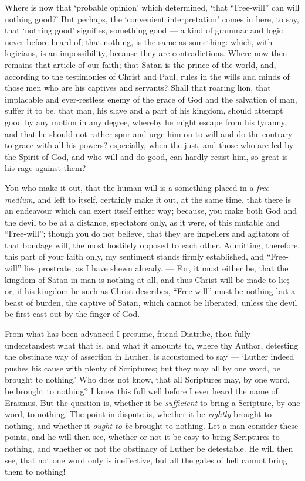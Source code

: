 Where is now that ‘probable opinion’ which determined, ‘that “Free-will” can will nothing good?’ But perhaps, the ‘convenient interpretation’ comes in here, to say, that ‘nothing good’ signifies, something good — a kind of grammar and logic never before heard of; that nothing, is the same as something: which, with logicians, is an impossibility, because they are contradictions. Where now then remains that article of our faith; that Satan is the prince of the world, and, according to the testimonies of Christ and Paul, rules in the wills and minds of those men who are his captives and servants? Shall that roaring lion, that implacable and ever-restless enemy of the grace of God and the salvation of man, suffer it to be, that man, his slave and a part of his kingdom, should attempt good by any motion in any degree, whereby he might escape from his tyranny, and that he should not rather spur and urge him on to will and do the contrary to grace with all his powers? especially, when the just, and those who are led by the Spirit of God, and who will and do good, can hardly resist him, so great is his rage against them?

You who make it out, that the human will is a something placed in a \emph{free medium, }and left to itself, certainly make it out, at the same time, that there is an endeavour which can exert itself either way; because, you make both God and the devil to be at a distance, spectators only, as it were, of this mutable and “Free-will”; though you do not believe, that they are impellers and agitators of that bondage will, the most hostilely opposed to each other. Admitting, therefore, this part of your faith only, my sentiment stands firmly established, and “Free-will” lies prostrate; as I have shewn already. — For, it must either be, that the kingdom of Satan in man is nothing at all, and thus Christ will be made to lie; or, if his kingdom be such as Christ describes, “Free-will” must be nothing but a beast of burden, the captive of Satan, which cannot be liberated, unless the devil be first cast out by the finger of God.

From what has been advanced I presume, friend Diatribe, thou fully understandest what that is, and what it amounts to, where thy Author, detesting the obstinate way of assertion in Luther, is accustomed to say — ‘Luther indeed pushes his cause with plenty of Scriptures; but they may all by one word, be brought to nothing.’ Who does not know, that all Scriptures may, by one word, be brought to nothing? I knew this full well before I ever heard the name of Erasmus. But the question is, whether it be \emph{sufficient }to bring a Scripture, by one word, to nothing. The point in dispute is, whether it be \emph{rightly }brought to nothing, and whether it \emph{ought to be }brought to nothing. Let a man consider these points, and he will then see, whether or not it be easy to bring Scriptures to nothing, and whether or not the obstinacy of Luther be detestable. He will then see, that not one word only is ineffective, but all the gates of hell cannot bring them to nothing!

